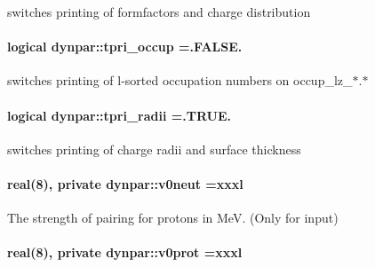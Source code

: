switches printing of formfactors and charge distribution 

\paragraph[{\texorpdfstring{tpri\+\_\+occup}{tpri_occup}}]{\setlength{\rightskip}{0pt plus 5cm}logical dynpar\+::tpri\+\_\+occup =.F\+A\+L\+S\+E.}\hypertarget{namespacedynpar_a2f991da94ce72ea9621829c805eb88c8}{}\label{namespacedynpar_a2f991da94ce72ea9621829c805eb88c8}


switches printing of l-\/sorted occupation numbers on \textquotesingle{}occup\+\_\+lz\+\_\+$\ast$.$\ast$\textquotesingle{} 

\paragraph[{\texorpdfstring{tpri\+\_\+radii}{tpri_radii}}]{\setlength{\rightskip}{0pt plus 5cm}logical dynpar\+::tpri\+\_\+radii =.T\+R\+U\+E.}\hypertarget{namespacedynpar_a6e3c31345887781dcf51743c54942fdd}{}\label{namespacedynpar_a6e3c31345887781dcf51743c54942fdd}


switches printing of charge radii and surface thickness 

\paragraph[{\texorpdfstring{v0neut}{v0neut}}]{\setlength{\rightskip}{0pt plus 5cm}real(8), private dynpar\+::v0neut =xxxl\hspace{0.3cm}{\ttfamily [private]}}\hypertarget{namespacedynpar_a656bd2f9ddcf1d701af02645567c4038}{}\label{namespacedynpar_a656bd2f9ddcf1d701af02645567c4038}


The strength of pairing for protons in MeV. (Only for input) 

\paragraph[{\texorpdfstring{v0prot}{v0prot}}]{\setlength{\rightskip}{0pt plus 5cm}real(8), private dynpar\+::v0prot =xxxl\hspace{0.3cm}{\ttfamily [private]}}\hypertarget{namespacedynpar_a2b76f1e73803ee77254ad356dd9054d4}{}\label{namespacedynpar_a2b76f1e73803ee77254ad356dd9054d4}


